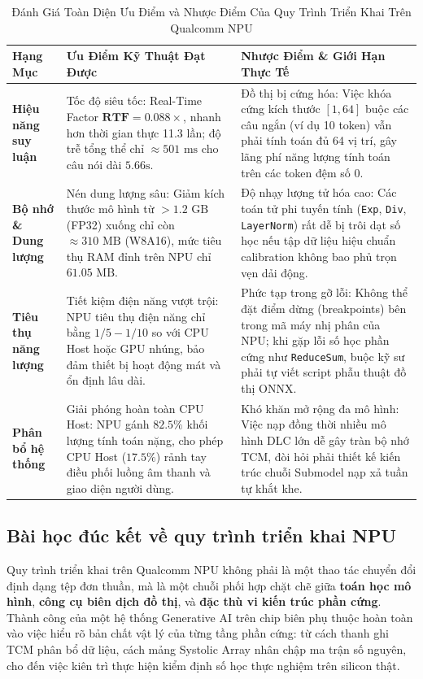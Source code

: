\documentclass[11pt,a4paper,oneside,table]{report}
\begin{document}
\begin{table}[H]
\centering
\small
\sffamily
\caption{Đánh Giá Toàn Diện Ưu Điểm và Nhược Điểm Của Quy Trình Triển Khai Trên Qualcomm NPU}
\label{tab:pros_and_cons}
\vspace{2mm}
\begin{tabularx}{\textwidth}{l p{6.0cm} p{6.0cm}}
\toprule
\textbf{Hạng Mục} & \textbf{Ưu Điểm Kỹ Thuật Đạt Được} & \textbf{Nhược Điểm \& Giới Hạn Thực Tế} \\
\midrule
\textbf{Hiệu năng suy luận} & Tốc độ siêu tốc: Real-Time Factor $\mathbf{RTF = 0.088\times}$, nhanh hơn thời gian thực 11.3 lần; độ trễ tổng thể chỉ $\approx 501\text{ ms}$ cho câu nói dài $5.66\text{s}$. & Đồ thị bị cứng hóa: Việc khóa cứng kích thước $[1, 64]$ buộc các câu ngắn (ví dụ 10 token) vẫn phải tính toán đủ 64 vị trí, gây lãng phí năng lượng tính toán trên các token đệm số 0. \\
\addlinespace
\textbf{Bộ nhớ \& Dung lượng} & Nén dung lượng sâu: Giảm kích thước mô hình từ $>1.2\text{ GB}$ (FP32) xuống chỉ còn $\approx 310\text{ MB}$ (W8A16), mức tiêu thụ RAM đỉnh trên NPU chỉ $61.05\text{ MB}$. & Độ nhạy lượng tử hóa cao: Các toán tử phi tuyến tính (\texttt{Exp}, \texttt{Div}, \texttt{LayerNorm}) rất dễ bị trôi dạt số học nếu tập dữ liệu hiệu chuẩn calibration không bao phủ trọn vẹn dải động. \\
\addlinespace
\textbf{Tiêu thụ năng lượng} & Tiết kiệm điện năng vượt trội: NPU tiêu thụ điện năng chỉ bằng $1/5 - 1/10$ so với CPU Host hoặc GPU nhúng, bảo đảm thiết bị hoạt động mát và ổn định lâu dài. & Phức tạp trong gỡ lỗi: Không thể đặt điểm dừng (breakpoints) bên trong mã máy nhị phân của NPU; khi gặp lỗi số học phần cứng như \texttt{ReduceSum}, buộc kỹ sư phải tự viết script phẫu thuật đồ thị ONNX. \\
\addlinespace
\textbf{Phân bổ hệ thống} & Giải phóng hoàn toàn CPU Host: NPU gánh $82.5\%$ khối lượng tính toán nặng, cho phép CPU Host ($17.5\%$) rảnh tay điều phối luồng âm thanh và giao diện người dùng. & Khó khăn mở rộng đa mô hình: Việc nạp đồng thời nhiều mô hình DLC lớn dễ gây tràn bộ nhớ TCM, đòi hỏi phải thiết kế kiến trúc chuỗi Submodel nạp xả tuần tự khắt khe. \\
\bottomrule
\end{tabularx}
\end{table}

\subsection{Bài học đúc kết về quy trình triển khai NPU}
Quy trình triển khai trên Qualcomm NPU không phải là một thao tác chuyển đổi định dạng tệp đơn thuần, mà là một chuỗi phối hợp chặt chẽ giữa \textbf{toán học mô hình}, \textbf{công cụ biên dịch đồ thị}, và \textbf{đặc thù vi kiến trúc phần cứng}. Thành công của một hệ thống Generative AI trên chip biên phụ thuộc hoàn toàn vào việc hiểu rõ bản chất vật lý của từng tầng phần cứng: từ cách thanh ghi TCM phân bổ dữ liệu, cách mảng Systolic Array nhân chập ma trận số nguyên, cho đến việc kiên trì thực hiện kiểm định số học thực nghiệm trên silicon thật.
\end{document}
